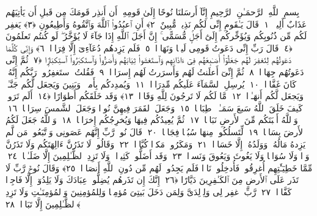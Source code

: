 
  
    
  
    
    

\nopagebreak
  بِسمِ ٱللَّهِ ٱلرَّحمَـٰنِ ٱلرَّحِيمِ
  إِنَّآ أَرسَلنَا نُوحًا إِلَىٰ قَومِهِۦٓ أَن أَنذِر قَومَكَ مِن قَبلِ أَن يَأتِيَهُم عَذَابٌ أَلِيمٌۭ ﴿١﴾
 قَالَ يَـٰقَومِ إِنِّى لَكُم نَذِيرٌۭ مُّبِينٌ ﴿٢﴾
 أَنِ ٱعبُدُوا۟ ٱللَّهَ وَٱتَّقُوهُ وَأَطِيعُونِ ﴿٣﴾
 يَغفِر لَكُم مِّن ذُنُوبِكُم وَيُؤَخِّركُم إِلَىٰٓ أَجَلٍۢ مُّسَمًّى ۚ إِنَّ أَجَلَ ٱللَّهِ إِذَا جَآءَ لَا يُؤَخَّرُ ۖ لَو كُنتُم تَعلَمُونَ ﴿٤﴾
 قَالَ رَبِّ إِنِّى دَعَوتُ قَومِى لَيلًۭا وَنَهَارًۭا ﴿٥﴾
 فَلَم يَزِدهُم دُعَآءِىٓ إِلَّا فِرَارًۭا ﴿٦﴾
 وَإِنِّى كُلَّمَا دَعَوتُهُم لِتَغفِرَ لَهُم جَعَلُوٓا۟ أَصَـٰبِعَهُم فِىٓ ءَاذَانِهِم وَٱستَغشَوا۟ ثِيَابَهُم وَأَصَرُّوا۟ وَٱستَكبَرُوا۟ ٱستِكبَارًۭا ﴿٧﴾
 ثُمَّ إِنِّى دَعَوتُهُم جِهَارًۭا ﴿٨﴾
 ثُمَّ إِنِّىٓ أَعلَنتُ لَهُم وَأَسرَرتُ لَهُم إِسرَارًۭا ﴿٩﴾
 فَقُلتُ ٱستَغفِرُوا۟ رَبَّكُم إِنَّهُۥ كَانَ غَفَّارًۭا ﴿١٠﴾
 يُرسِلِ ٱلسَّمَآءَ عَلَيكُم مِّدرَارًۭا ﴿١١﴾
 وَيُمدِدكُم بِأَموَٟلٍۢ وَبَنِينَ وَيَجعَل لَّكُم جَنَّـٰتٍۢ وَيَجعَل لَّكُم أَنهَـٰرًۭا ﴿١٢﴾
 مَّا لَكُم لَا تَرجُونَ لِلَّهِ وَقَارًۭا ﴿١٣﴾
 وَقَد خَلَقَكُم أَطوَارًا ﴿١٤﴾
 أَلَم تَرَوا۟ كَيفَ خَلَقَ ٱللَّهُ سَبعَ سَمَـٰوَٟتٍۢ طِبَاقًۭا ﴿١٥﴾
 وَجَعَلَ ٱلقَمَرَ فِيهِنَّ نُورًۭا وَجَعَلَ ٱلشَّمسَ سِرَاجًۭا ﴿١٦﴾
 وَٱللَّهُ أَنۢبَتَكُم مِّنَ ٱلأَرضِ نَبَاتًۭا ﴿١٧﴾
 ثُمَّ يُعِيدُكُم فِيهَا وَيُخرِجُكُم إِخرَاجًۭا ﴿١٨﴾
 وَٱللَّهُ جَعَلَ لَكُمُ ٱلأَرضَ بِسَاطًۭا ﴿١٩﴾
 لِّتَسلُكُوا۟ مِنهَا سُبُلًۭا فِجَاجًۭا ﴿٢٠﴾
 قَالَ نُوحٌۭ رَّبِّ إِنَّهُم عَصَونِى وَٱتَّبَعُوا۟ مَن لَّم يَزِدهُ مَالُهُۥ وَوَلَدُهُۥٓ إِلَّا خَسَارًۭا ﴿٢١﴾
 وَمَكَرُوا۟ مَكرًۭا كُبَّارًۭا ﴿٢٢﴾
 وَقَالُوا۟ لَا تَذَرُنَّ ءَالِهَتَكُم وَلَا تَذَرُنَّ وَدًّۭا وَلَا سُوَاعًۭا وَلَا يَغُوثَ وَيَعُوقَ وَنَسرًۭا ﴿٢٣﴾
 وَقَد أَضَلُّوا۟ كَثِيرًۭا ۖ وَلَا تَزِدِ ٱلظَّـٰلِمِينَ إِلَّا ضَلَـٰلًۭا ﴿٢٤﴾
 مِّمَّا خَطِيٓـَٰٔتِهِم أُغرِقُوا۟ فَأُدخِلُوا۟ نَارًۭا فَلَم يَجِدُوا۟ لَهُم مِّن دُونِ ٱللَّهِ أَنصَارًۭا ﴿٢٥﴾
 وَقَالَ نُوحٌۭ رَّبِّ لَا تَذَر عَلَى ٱلأَرضِ مِنَ ٱلكَـٰفِرِينَ دَيَّارًا ﴿٢٦﴾
 إِنَّكَ إِن تَذَرهُم يُضِلُّوا۟ عِبَادَكَ وَلَا يَلِدُوٓا۟ إِلَّا فَاجِرًۭا كَفَّارًۭا ﴿٢٧﴾
 رَّبِّ ٱغفِر لِى وَلِوَٟلِدَىَّ وَلِمَن دَخَلَ بَيتِىَ مُؤمِنًۭا وَلِلمُؤمِنِينَ وَٱلمُؤمِنَـٰتِ وَلَا تَزِدِ ٱلظَّـٰلِمِينَ إِلَّا تَبَارًۢا ﴿٢٨﴾
 
